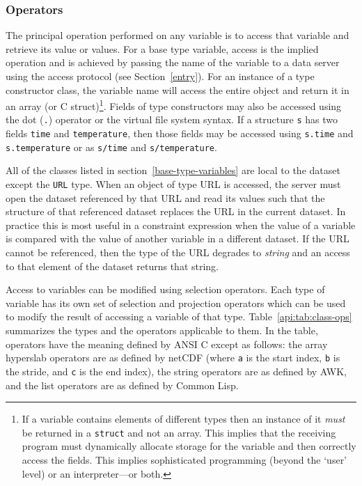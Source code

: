 \subsubsection{Operators}
\label{api:operators}

The principal operation performed on any variable is to access that variable
and retrieve its value or values.  For a base type variable, access is the
implied operation and is achieved by passing the name of the variable to a
data server using the access protocol (see Section~\ref{entry}). For an
instance of a type constructor class, the variable name will access the
entire object and return it in an array (or C struct)\footnote{If a variable
  contains elements of different types then an instance of it {\em must\/} be
  returned in a {\tt struct} and not an array.  This implies that the
  receiving program must dynamically allocate storage for the variable and
  then correctly access the fields.  This implies sophisticated programming
  (beyond the `user' level) or an interpreter---or both.}. Fields of type
constructors may also be accessed using the dot ({\tt.}) operator or the
virtual file system syntax. If a structure {\tt s} has two fields {\tt time}
and {\tt temperature}, then those fields may be accessed using {\tt s.time}
and {\tt s.temperature} or as {\tt s/time} and {\tt s/temperature}.

All of the classes listed in section~\ref{base-type-variables} are local to
the dataset except the {\tt URL} type. When an object of type URL is
accessed, the server must open the dataset referenced by that URL and read
its values such that the structure of that referenced dataset replaces the
URL in the current dataset. In practice this is most useful in a constraint
expression when the value of a variable is compared with the value of another
variable in a different dataset. If the URL cannot be referenced, then the
type of the URL degrades to {\em string\/} and an access to that element of
the dataset returns that string.

Access to variables can be modified using selection operators. Each
type of variable has its own set of selection and projection operators
which can be used to modify the result of accessing a variable of that
type.  Table~\ref{api:tab:class-ops} summarizes the types and the
operators applicable to them. In the table, operators have the meaning
defined by ANSI C except as follows: the array hyperslab operators are
as defined by netCDF\cite{netcdf} (where {\tt a} is the start index,
{\tt b} is the stride, and {\tt c} is the end index), the string
operators are as defined by AWK\cite{kern:upe}, and the list operators
are as defined by Common Lisp\cite{steele:clisp}.

